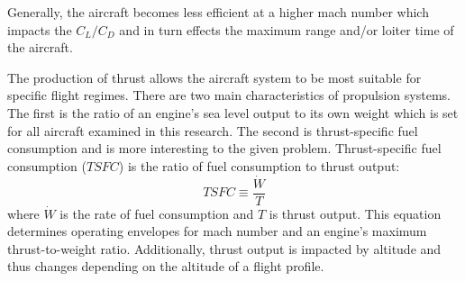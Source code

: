 Generally, the aircraft becomes less efficient at a higher mach number which impacts the $C_L/C_D$ and in turn effects the maximum range and/or loiter time of the aircraft. \par
The production of thrust allows the aircraft system to be most suitable for specific flight regimes. There are two main characteristics of propulsion systems. The first is the ratio of an engine's sea level output to its own weight which is set for all aircraft examined in this research. The second is thrust-specific fuel consumption and is more interesting to the given problem. Thrust-specific fuel consumption ($TSFC$) is the ratio of fuel consumption to thrust output:
\begin{equation*}
    TSFC\equiv \dfrac{\dot{W}}{T}
\end{equation*}
where $\dot{W}$ is the rate of fuel consumption and $T$ is thrust output. This equation determines operating envelopes for mach number and an engine's maximum thrust-to-weight ratio. Additionally, thrust output is impacted by altitude and thus changes depending on the altitude of a flight profile.
